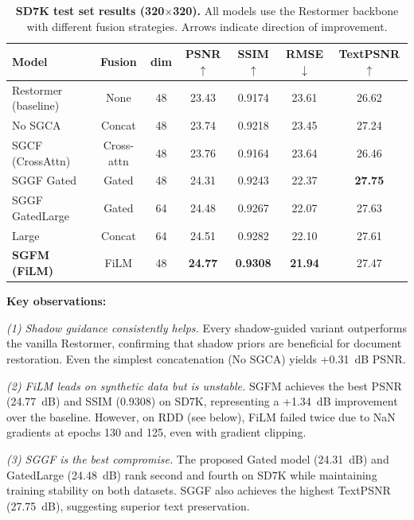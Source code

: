 \documentclass[11pt]{article}
\begin{document}
\begin{table}[t]
\centering
\caption{\textbf{SD7K test set results (320$\times$320).} All models use the Restormer backbone with different fusion strategies. Arrows indicate direction of improvement.}
\label{tab:sd7k}
\begin{tabular}{@{}lcccccc@{}}
\toprule
\textbf{Model} & \textbf{Fusion} & \textbf{dim} & \textbf{PSNR$\uparrow$} & \textbf{SSIM$\uparrow$} & \textbf{RMSE$\downarrow$} & \textbf{TextPSNR$\uparrow$} \\
\midrule
Restormer (baseline)  & None        & 48 & 23.43 & 0.9174 & 23.61 & 26.62 \\
No SGCA               & Concat      & 48 & 23.74 & 0.9218 & 23.45 & 27.24 \\
SGCF (CrossAttn)      & Cross-attn  & 48 & 23.76 & 0.9164 & 23.64 & 26.46 \\
SGGF Gated            & Gated       & 48 & 24.31 & 0.9243 & 22.37 & \textbf{27.75} \\
SGGF GatedLarge       & Gated       & 64 & 24.48 & 0.9267 & 22.07 & 27.63 \\
Large                 & Concat      & 64 & 24.51 & 0.9282 & 22.10 & 27.61 \\
\rowcolor{gray!15}
\textbf{SGFM (FiLM)}   & FiLM        & 48 & \textbf{24.77} & \textbf{0.9308} & \textbf{21.94} & 27.47 \\
\bottomrule
\end{tabular}
\end{table}

\textbf{Key observations:}

\textit{(1) Shadow guidance consistently helps.} Every shadow-guided variant outperforms the vanilla Restormer, confirming that shadow priors are beneficial for document restoration. Even the simplest concatenation (No SGCA) yields +0.31~dB PSNR.

\textit{(2) FiLM leads on synthetic data but is unstable.} SGFM achieves the best PSNR (24.77~dB) and SSIM (0.9308) on SD7K, representing a +1.34~dB improvement over the baseline. However, on RDD (see below), FiLM failed twice due to NaN gradients at epochs 130 and 125, even with gradient clipping.

\textit{(3) SGGF is the best compromise.} The proposed Gated model (24.31~dB) and GatedLarge (24.48~dB) rank second and fourth on SD7K while maintaining training stability on both datasets. SGGF also achieves the highest TextPSNR (27.75~dB), suggesting superior text preservation.
\end{document}
